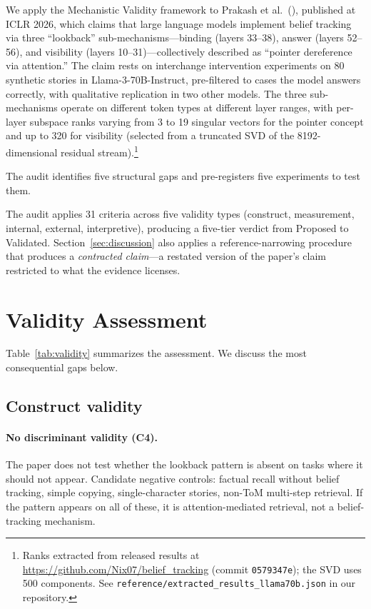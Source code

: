 \documentclass[11pt]{article}
\begin{document}
We apply the Mechanistic Validity framework \citep{tower2026mechval} to Prakash et al.\ (\citeyear{prakash2025lookback}), published at ICLR 2026, which claims that large language models implement belief tracking via three ``lookback'' sub-mechanisms---binding (layers 33--38), answer (layers 52--56), and visibility (layers 10--31)---collectively described as ``pointer dereference via attention.'' The claim rests on interchange intervention experiments on 80 synthetic stories in Llama-3-70B-Instruct, pre-filtered to cases the model answers correctly, with qualitative replication in two other models. The three sub-mechanisms operate on different token types at different layer ranges, with per-layer subspace ranks varying from 3 to 19 singular vectors for the pointer concept and up to 320 for visibility (selected from a truncated SVD of the 8192-dimensional residual stream).\footnote{Ranks extracted from released results at \url{https://github.com/Nix07/belief_tracking} (commit \texttt{0579347e}); the SVD uses 500 components. See \texttt{reference/extracted\_results\_llama70b.json} in our repository.}

The audit identifies five structural gaps and pre-registers five experiments to test them.

The audit applies 31 criteria across five validity types (construct, measurement, internal, external, interpretive), producing a five-tier verdict from Proposed to Validated. Section~\ref{sec:discussion} also applies a reference-narrowing procedure that produces a \emph{contracted claim}---a restated version of the paper's claim restricted to what the evidence licenses.


\section{Validity Assessment}
\label{sec:validity}

Table~\ref{tab:validity} summarizes the assessment. We discuss the most consequential gaps below.

\subsection{Construct validity}

\paragraph{No discriminant validity (C4).}
The paper does not test whether the lookback pattern is absent on tasks where it should not appear. Candidate negative controls: factual recall without belief tracking, simple copying, single-character stories, non-ToM multi-step retrieval. If the pattern appears on all of these, it is attention-mediated retrieval, not a belief-tracking mechanism.
\end{document}
